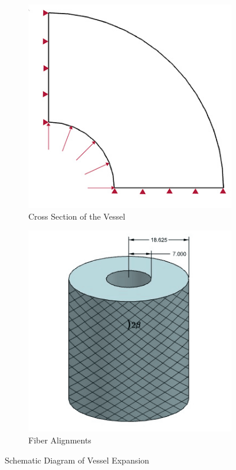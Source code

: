 \begin{figure}[H]
	\centering
	\begin{subfigure}[b]{0.3\textwidth}
		\centering
		\includegraphics[width=\textwidth]{./figures/vessel_schematic.jpg}
		\caption{Cross Section of the Vessel}
		\label{fig:vessel_schematic}
	\end{subfigure}
	\begin{subfigure}[b]{0.4\textwidth}
		\centering
		\includegraphics[width=\textwidth]{./figures/vessel_schematic2.png}
		\caption{Fiber Alignments}
		\label{fig:vessel_schematic2}
	\end{subfigure}
	\caption{Schematic Diagram of Vessel Expansion}
\end{figure}

